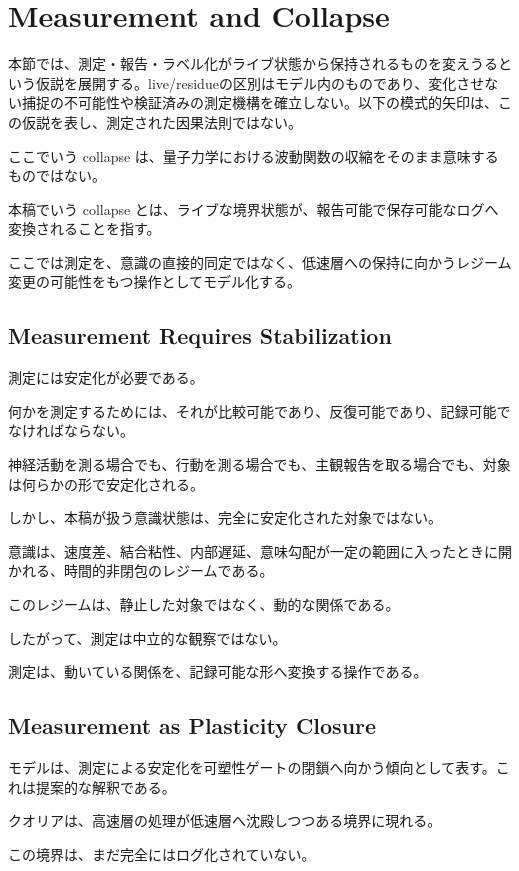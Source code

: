 \section{Measurement and Collapse}


本節では、測定・報告・ラベル化がライブ状態から保持されるものを変えうるという仮説を展開する。live/residueの区別はモデル内のものであり、変化させない捕捉の不可能性や検証済みの測定機構を確立しない。以下の模式的矢印は、この仮説を表し、測定された因果法則ではない。

ここでいう collapse は、量子力学における波動関数の収縮をそのまま意味するものではない。

本稿でいう collapse とは、ライブな境界状態が、報告可能で保存可能なログへ変換されることを指す。

ここでは測定を、意識の直接的同定ではなく、低速層への保持に向かうレジーム変更の可能性をもつ操作としてモデル化する。

\subsection{Measurement Requires Stabilization}

測定には安定化が必要である。

何かを測定するためには、それが比較可能であり、反復可能であり、記録可能でなければならない。

神経活動を測る場合でも、行動を測る場合でも、主観報告を取る場合でも、対象は何らかの形で安定化される。

しかし、本稿が扱う意識状態は、完全に安定化された対象ではない。

意識は、速度差、結合粘性、内部遅延、意味勾配が一定の範囲に入ったときに開かれる、時間的非閉包のレジームである。

このレジームは、静止した対象ではなく、動的な関係である。

したがって、測定は中立的な観察ではない。

測定は、動いている関係を、記録可能な形へ変換する操作である。

\subsection{Measurement as Plasticity Closure}

モデルは、測定による安定化を可塑性ゲートの閉鎖へ向かう傾向として表す。これは提案的な解釈である。

クオリアは、高速層の処理が低速層へ沈殿しつつある境界に現れる。

この境界は、まだ完全にはログ化されていない。

